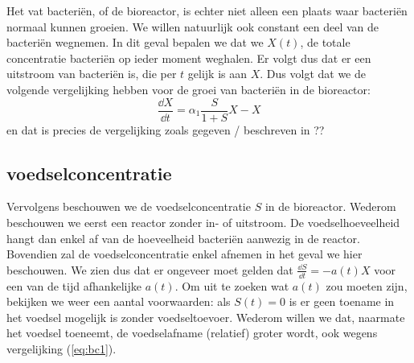Het vat bacteri\"en, of de bioreactor, is echter niet alleen een plaats waar bacteri\"en normaal kunnen groeien. We willen natuurlijk ook constant een deel van de bacteri\"en wegnemen. In dit geval bepalen we dat we $X(t)$, de totale concentratie bacteri\"en op ieder moment weghalen. Er volgt dus dat er een uitstroom van bacteri\"en is, die per $t$ gelijk is aan $X$. Dus volgt dat we de volgende vergelijking hebben voor de groei van bacteri\"en in de bioreactor:
\begin{equation}
	\frac{\dd X}{\dd t} = \alpha_1 \frac{S}{1+S} X - X 		\label{eq:bc1}
\end{equation}
en dat is precies de vergelijking zoals gegeven / beschreven in ??%


\subsection*{voedselconcentratie}
Vervolgens beschouwen we de voedselconcentratie $S$ in de bioreactor. Wederom beschouwen we eerst een reactor zonder in- of uitstroom. De voedselhoeveelheid hangt dan enkel af van de hoeveelheid bacteri\"en aanwezig in de reactor. Bovendien zal de voedselconcentratie enkel afnemen in het geval we hier beschouwen. We zien dus dat er ongeveer moet gelden dat $\tfrac{\dd S}{\dd t} = - a(t) X$ voor een van de tijd afhankelijke $a(t)$. Om uit te zoeken wat $a(t)$ zou moeten zijn, bekijken we weer een aantal voorwaarden: als $S(t) = 0$ is er geen toename in het voedsel mogelijk is zonder voedseltoevoer. Wederom willen we dat, naarmate het voedsel toeneemt, de voedselafname (relatief) groter wordt, ook wegens vergelijking (\ref{eq:bc1}). 


